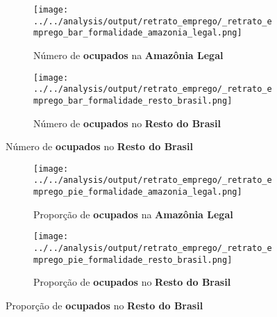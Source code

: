 \documentclass[11pt]{beamer}
\begin{document}
\begin{frame}[label=_retrato_emprego_bar_formalidade]{}
\textit{\hyperlink{indice_principal}{}}
\begin{figure}
\centering
\begin{subfigure}{.5\textwidth}
  \centering
  \texttt{[image: ../../analysis/output/retrato\_emprego/\_retrato\_emprego\_bar\_formalidade\_amazonia\_legal.png]}
  \label{fig:_retrato_emprego_bar_formalidade_amazonia_legal}
  \caption{{\tiny Número de \textbf{ocupados} na \textbf{Amazônia Legal}}}
\end{subfigure}%
\begin{subfigure}{.5\textwidth}
  \centering
  \texttt{[image: ../../analysis/output/retrato\_emprego/\_retrato\_emprego\_bar\_formalidade\_resto\_brasil.png]}
  \label{fig:_retrato_emprego_bar_formalidade_resto_brasil}
   \caption{{\tiny Número de \textbf{ocupados} no \textbf{Resto do Brasil}}}
\end{subfigure}
\end{figure}
\end{frame}

\begin{frame}[label=_retrato_emprego_pie_formalidade]{}
\textit{\hyperlink{indice_principal}{}}
\begin{figure}
\centering
\begin{subfigure}{.5\textwidth}
  \centering
  \texttt{[image: ../../analysis/output/retrato\_emprego/\_retrato\_emprego\_pie\_formalidade\_amazonia\_legal.png]}
  \label{fig:_retrato_emprego_pie_formalidade_amazonia_legal}
  \caption{{\tiny Proporção de \textbf{ocupados} na \textbf{Amazônia Legal}}}
\end{subfigure}%
\begin{subfigure}{.5\textwidth}
  \centering
  \texttt{[image: ../../analysis/output/retrato\_emprego/\_retrato\_emprego\_pie\_formalidade\_resto\_brasil.png]}
  \label{fig:_retrato_emprego_pie_formalidade_resto_brasil}
   \caption{{\tiny Proporção de \textbf{ocupados} no \textbf{Resto do Brasil}}}
\end{subfigure}
\end{figure}
\end{frame}
\end{document}
